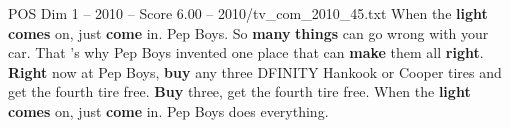 \begin{textsample}{POS Dim 1 – 2010 – Score 6.00 – 2010/tv\_com\_2010\_45.txt}  \label{ex:f1_pos_061}
When the \textbf{light} \textbf{comes} on, just \textbf{come} in.
Pep Boys.
So \textbf{many} \textbf{things} can go wrong with your car.
That 's why Pep Boys invented one place that can \textbf{make} them all \textbf{right}. \textbf{Right} now at Pep Boys, \textbf{buy} any three DFINITY Hankook or Cooper tires and get the fourth tire free. \textbf{Buy} three, get the fourth tire free.
When the \textbf{light} \textbf{comes} on, just \textbf{come} in.
Pep Boys does everything.

\end{textsample}
